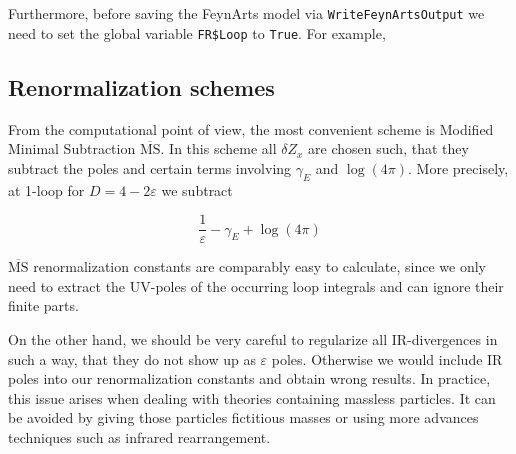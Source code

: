 \documentclass[../FeynCalcManual.tex]{subfiles}
\begin{document}
Furthermore, before saving the FeynArts model via
\texttt{WriteFeynArtsOutput} we need to set the global variable
\texttt{FR\$Loop} to \texttt{True}. For example,

\begin{Shaded}
\begin{Highlighting}[]
\ExtensionTok{=}\NormalTok{;}
\OperatorTok{[}\OperatorTok{[\{}\OperatorTok{,}\OperatorTok{,}\OperatorTok{,}\OperatorTok{,}\OperatorTok{\}]]}\NormalTok{;}
\OperatorTok{[}\OperatorTok{,}\OtherTok{{-}\textgreater{}}\OperatorTok{,}\OtherTok{{-}\textgreater{}}\OperatorTok{]}\NormalTok{;}
\end{Highlighting}
\end{Shaded}

\hypertarget{renormalization-schemes}{%
\subsection{Renormalization schemes}\label{renormalization-schemes}}

From the computational point of view, the most convenient scheme is
Modified Minimal Subtraction \(\overline{\textrm{MS}}\). In this scheme
all \(\delta Z_x\) are chosen such, that they subtract the poles and
certain terms involving \(\gamma_E\) and \(\log(4\pi)\). More precisely,
at 1-loop for \(D= 4 - 2 \varepsilon\) we subtract

\begin{equation}
\frac{1}{\varepsilon} - \gamma_E + \log (4\pi)
\end{equation}

\(\overline{\textrm{MS}}\) renormalization constants are comparably easy
to calculate, since we only need to extract the UV-poles of the
occurring loop integrals and can ignore their finite parts.

On the other hand, we should be very careful to regularize all
IR-divergences in such a way, that they do not show up as
\(\varepsilon\) poles. Otherwise we would include IR poles into our
renormalization constants and obtain wrong results. In practice, this
issue arises when dealing with theories containing massless particles.
It can be avoided by giving those particles fictitious masses or using
more advances techniques such as infrared rearrangement.
\end{document}
